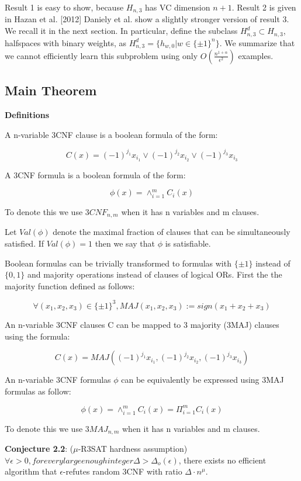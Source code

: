 \documentclass[11pt,a4paper]{article}
\begin{document}
Result 1 is easy to show, because $H_{n, 3}$ has VC dimension $n + 1$.
Result 2 is given in Hazan et al. [2012] Daniely et al. show a slightly stronger version of result 3. We recall it in the next section. In particular, define the subclass $H_{n, 3}^d \subset H_{n, 3}$, halfspaces with binary weights, as $H_{n, 3}^d = \{h_{w, 0} | w \in \{\pm 1\}^n\}$. We summarize that we cannot efficiently learn this subproblem using only $O(\frac{n^{1 + \alpha}}{\epsilon^2})$ examples.

\subsection{Main Theorem}

\textbf{Definitions}

A n-variable 3CNF clause is a boolean formula of the form:

$$C(x) = (-1)^{j_1}x_{i_1} \vee (-1)^{j_2}x_{i_2} \vee (-1)^{j_3}x_{i_3} $$

A 3CNF formula is a boolean formula of the form:

$$ \phi(x) = \wedge^m_{i=1} C_{i}(x) $$

To denote this we use $3CNF_{n,m}$ when it has n variables and m clauses.

Let $Val(\phi)$ denote the maximal fraction of clauses that can be simultaneously satisfied. If $Val(\phi) =  1$ then we say that $\phi$ is satisfiable.

Boolean formulas can be trivially transformed to formulas with $\{ \pm 1 \}$ instead of $\{ 0,1 \}$ and majority operations instead of clauses of logical ORs.
First the the majority function defined as follows:

$$\forall (x_1, x_2, x_3) \in \{ \pm 1 \}^3, MAJ(x_1, x_2, x_3 ) := sign(x_1 + x_2 + x_3 )$$

An n-variable 3CNF clauses C can be mapped to 3 majority (3MAJ) clauses using the formula:

$$ C(x) = MAJ( (-1)^{j_1}x_{i_1} , (-1)^{j_2}x_{i_2} , (-1)^{j_3}x_{i_3} )$$

An n-variable 3CNF formulas $\phi$ can be equivalently be expressed using 3MAJ formulas as follow:

$$ \phi(x) = \wedge^m_{i=1} C_{i}(x)  = \Pi^m_{i=1} C_{i}(x) $$

To denote this we use $3MAJ_{n,m}$ when it has n variables and m clauses.

\textbf{Conjecture 2.2}: ($\mu$-R3SAT hardness assumption) $\forall \epsilon > 0, for every large enough integer \Delta > \Delta_o(\epsilon) $, there exists no efficient algorithm that $\epsilon$-refutes random 3CNF with ratio $\Delta \cdot n^{\mu}$.
\end{document}
